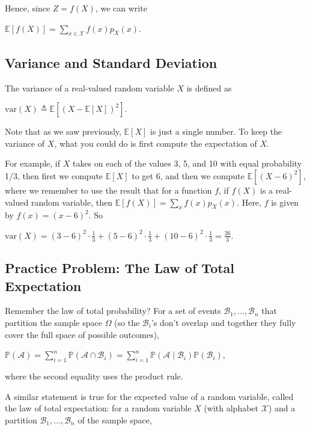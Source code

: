 \documentclass[6008notes.tex]{subfiles}
\begin{document}
Hence, since $Z=f(X)$, we can write

{\centering$\mathbb {E}[f(X)]=\sum _{x\in \mathcal{X}}f(x)p_{X}(x).$ \par}
 

\subsection{Variance and Standard Deviation}

The variance of a real-valued random variable $X$ is defined as

{\centering$\text {var}(X) \triangleq \mathbb {E}[ (X - \mathbb {E}[X])^2 ].$ \par}
 
Note that as we saw previously, $\mathbb {E}[X]$ is just a single number. To keep the variance of $X$, what you could do is first compute the expectation of $X$.

For example, if $X$ takes on each of the values 3, 5, and 10 with equal probability 1/3, then first we compute $\mathbb {E}[X]$ to get 6, and then we compute $\mathbb {E}[(X - 6)^2]$, where we remember to use the result that for a function $f$, if $f(X)$ is a real-valued random variable, then $\mathbb {E}[f(X)] = \sum _ x f(x) p_ X(x)$. Here, $f$ is given by $f(x) = (x-6)^2$. So

{\centering$\text {var}(X) = (3 - 6)^2 \cdot \frac13 + (5 - 6)^2 \cdot \frac13 + (10 - 6)^2 \cdot \frac13 = \frac{26}{3}.$ \par}


\subsection{Practice Problem: The Law of Total Expectation}

Remember the law of total probability? For a set of events $\mathcal{B}_{1},\dots ,\mathcal{B}_{n}$ that partition the sample space $\Omega$ (so the $\mathcal{B}_{i}$'s don't overlap and together they fully cover the full space of possible outcomes),

{\centering$\mathbb {P}(\mathcal{A})=\sum _{i=1}^{n}\mathbb {P}(\mathcal{A}\cap \mathcal{B}_{i})=\sum _{i=1}^{n}\mathbb {P}(\mathcal{A}\mid \mathcal{B}_{i})\mathbb {P}(\mathcal{B}_{i}),$ \par}
 
where the second equality uses the product rule.

A similar statement is true for the expected value of a random variable, called the law of total expectation: for a random variable $X$ (with alphabet $\mathcal{X}$) and a partition $\mathcal{B}_{1},\dots ,\mathcal{B}_{n}$ of the sample space,
\end{document}
